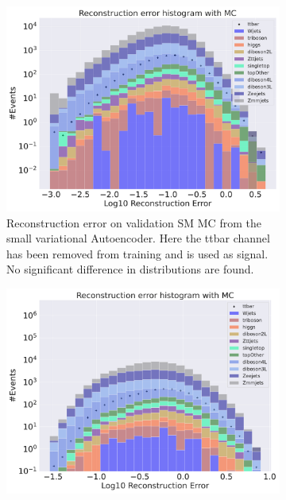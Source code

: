 \begin{figure}[h!]
    \centering
    \begin{subfigure}{.45\textwidth}
        \includegraphics[width=\textwidth]{Figures/VAE_testing/small/b_data_recon_big_rm3_feats_sig_ttbar.pdf}
        \caption{Reconstruction error on validation SM MC from the small variational Autoencoder. Here the ttbar channel has been removed from training and 
        is used as signal. No significant difference in distributions are found. }
        \label{fig:vae_small_ttbar}
    \end{subfigure}
    \hfill 
    \begin{subfigure}{.45\textwidth}
        \includegraphics[width=\textwidth]{Figures/VAE_testing/big/b_data_recon_big_rm3_feats_sig_ttbar.pdf}

\end{subfigure}
\end{figure}

